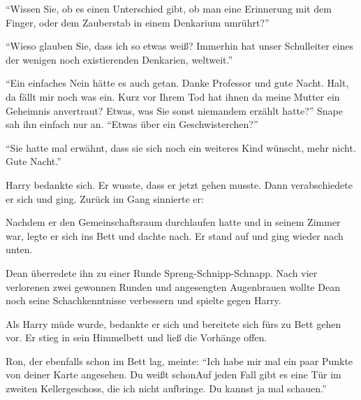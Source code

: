 \enquote{Wissen Sie, ob es einen Unterschied gibt, ob man eine Erinnerung mit dem Finger, oder dem Zauberstab in einem Denkarium umrührt?}

\enquote{Wieso glauben Sie, dass ich so etwas weiß? Immerhin hat unser Schulleiter eines der wenigen noch existierenden Denkarien, weltweit.}

\enquote{Ein einfaches Nein hätte es auch getan. Danke Professor und gute Nacht. \gst Halt, da fällt mir noch was ein. Kurz vor Ihrem Tod hat ihnen da meine Mutter ein Geheimnis anvertraut? Etwas, was Sie sonst niemandem erzählt hatte?} Snape sah ihn einfach nur an. \enquote{Etwas über ein Geschwisterchen?}

\enquote{Sie hatte mal erwähnt, dass sie sich noch ein weiteres Kind wünscht, mehr nicht. \gst Gute Nacht.}

Harry bedankte sich. Er wusste, dass er jetzt gehen musste. Dann verabschiedete er sich und ging. Zurück im Gang sinnierte er: 

Nachdem er den Gemeinschaftsraum durchlaufen hatte und in seinem Zimmer war, legte er sich ins Bett und dachte nach.  Er stand auf und ging wieder nach unten.

Dean überredete ihn zu einer Runde Spreng-Schnipp-Schnapp. Nach vier verlorenen zwei gewonnen Runden und angesengten Augenbrauen wollte Dean noch seine Schachkenntnisse verbessern und spielte gegen Harry.

Als Harry müde wurde, bedankte er sich und bereitete sich fürs zu Bett gehen vor. Er stieg in sein Himmelbett und ließ die Vorhänge offen.

Ron, der ebenfalls schon im Bett lag, meinte: \enquote{Ich habe mir mal ein paar Punkte von deiner Karte angesehen. Du weißt schon\abs Auf jeden Fall gibt es eine Tür im zweiten Kellergeschoss, die ich nicht aufbringe. Du kannst ja mal schauen.}

